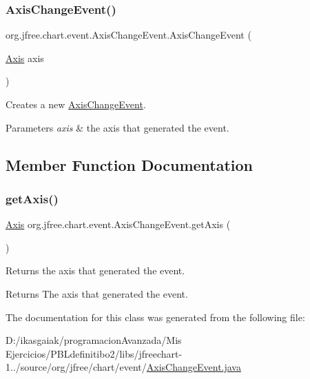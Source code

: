 \subsubsection{\texorpdfstring{Axis\+Change\+Event()}{AxisChangeEvent()}}
{\footnotesize\ttfamily org.\+jfree.\+chart.\+event.\+Axis\+Change\+Event.\+Axis\+Change\+Event (\begin{DoxyParamCaption}\item[{\mbox{\hyperlink{classorg_1_1jfree_1_1chart_1_1axis_1_1_axis}{Axis}}}]{axis }\end{DoxyParamCaption})}

Creates a new \mbox{\hyperlink{classorg_1_1jfree_1_1chart_1_1event_1_1_axis_change_event}{Axis\+Change\+Event}}.


\begin{DoxyParams}{Parameters}
{\em axis} & the axis that generated the event. \\
\hline
\end{DoxyParams}


\subsection{Member Function Documentation}
\mbox{\label{classorg_1_1jfree_1_1chart_1_1event_1_1_axis_change_event_ac9f904b878763c7f459d3b78f8584c25}} 
\subsubsection{\texorpdfstring{get\+Axis()}{getAxis()}}
{\footnotesize\ttfamily \mbox{\hyperlink{classorg_1_1jfree_1_1chart_1_1axis_1_1_axis}{Axis}} org.\+jfree.\+chart.\+event.\+Axis\+Change\+Event.\+get\+Axis (\begin{DoxyParamCaption}{ }\end{DoxyParamCaption})}

Returns the axis that generated the event.

\begin{DoxyReturn}{Returns}
The axis that generated the event. 
\end{DoxyReturn}


The documentation for this class was generated from the following file\+:\begin{DoxyCompactItemize}
\item 
D\+:/ikasgaiak/programacion\+Avanzada/\+Mis Ejercicios/\+P\+B\+Ldefinitibo2/libs/jfreechart-\/1../source/org/jfree/chart/event/\mbox{\hyperlink{_axis_change_event_8java}{Axis\+Change\+Event.\+java}}\end{DoxyCompactItemize}
